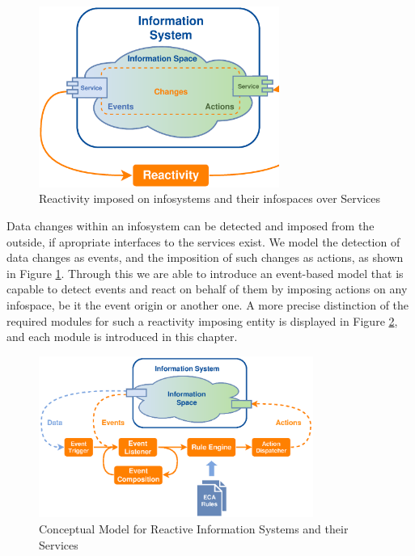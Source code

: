 \begin{figure}[!ht]
  \centering
  \includegraphics[width=0.7\textwidth]{figures/IS_InformationSpace}
  \caption{Reactivity imposed on \textrm{\glspl{infosystem}} and their \textrm{\glspl{infospace}} over Services}
  \label{fig:IS_InformationSpace}
\end{figure}
Data changes within an \textrm{\gls{infosystem}} can be detected and imposed from the outside, if apropriate interfaces to the services exist.
We model the detection of data changes as events, and the imposition of such changes as actions, as shown in Figure \ref{fig:IS_InformationSpace}.
Through this we are able to introduce an event-based model that is capable to detect events and react on behalf of them by imposing actions on any \textrm{\gls{infospace}}, be it the event origin or another one.
A more precise distinction of the required modules for such a reactivity imposing entity is displayed in Figure \ref{fig:Standard-Model-Template}, and each module is introduced in this chapter.
\begin{figure}[!ht]
  \centering
  \includegraphics[width=0.8\textwidth]{figures/Standard-Model-Template}
  \caption{Conceptual Model for Reactive Information Systems and their Services}
  \label{fig:Standard-Model-Template}
\end{figure}



